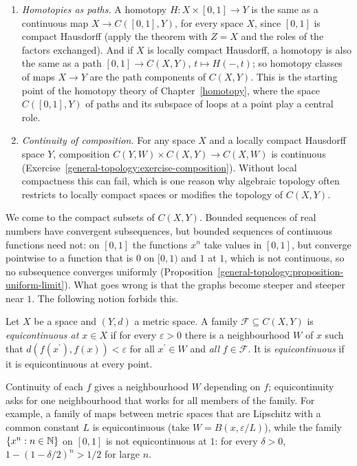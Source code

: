 \begin{example}\label{general-topology:example-exponential-law}
\begin{enumerate}
\item \emph{Homotopies as paths.} A homotopy $H \colon X \times [0, 1] \to Y$ is the same as a continuous map $X \to C([0, 1], Y)$, for every space $X$, since $[0, 1]$ is compact Hausdorff (apply
the theorem with $Z = X$ and the roles of the factors exchanged). And if $X$ is locally compact Hausdorff, a homotopy is also the same as a path $[0, 1] \to C(X, Y)$, $t \mapsto H(-, t)$; so
homotopy classes of maps $X \to Y$ are the path components of $C(X, Y)$. This is the starting point of the homotopy theory of Chapter~\ref{homotopy}, where the space $C([0, 1], Y)$ of paths and its
subspace of loops at a point play a central role.
\item \emph{Continuity of composition.} For any space $X$ and a locally compact Hausdorff space $Y$, composition $C(Y, W) \times C(X, Y) \to C(X, W)$ is continuous
(Exercise~\ref{general-topology:exercise-composition}). Without local compactness this can fail, which is one reason why algebraic topology often restricts to locally compact spaces or
modifies the topology of $C(X, Y)$.
\end{enumerate}
\end{example}

We come to the compact subsets of $C(X, Y)$. Bounded sequences of real numbers have convergent subsequences, but bounded sequences of continuous functions need not: on $[0, 1]$ the functions
$x^n$ take values in $[0, 1]$, but converge pointwise to a function that is $0$ on $[0, 1)$ and $1$ at $1$, which is not continuous, so no subsequence converges uniformly
(Proposition~\ref{general-topology:proposition-uniform-limit}). What goes wrong is that the graphs become steeper and steeper near $1$. The following notion forbids this.

\begin{definition}\label{general-topology:definition-equicontinuous}
Let $X$ be a space and $(Y, d)$ a metric space. A family $\mathcal{F} \subseteq C(X, Y)$ is \emph{equicontinuous at $x \in X$} if for every $\varepsilon > 0$ there is a neighbourhood $W$ of $x$
such that $d(f(x^{\prime}), f(x)) < \varepsilon$ for all $x^{\prime} \in W$ and \emph{all} $f \in \mathcal{F}$. It is \emph{equicontinuous} if it is equicontinuous at every point.
\end{definition}

Continuity of each $f$ gives a neighbourhood $W$ depending on $f$; equicontinuity asks for one neighbourhood that works for all members of the family. For example, a family of maps between metric
spaces that are Lipschitz with a common constant $L$ is equicontinuous (take $W = B(x, \varepsilon/L)$), while the family $\{x^n : n \in \mathbb{N}\}$ on $[0, 1]$ is not equicontinuous at $1$: for every
$\delta > 0$, $1 - (1 - \delta/2)^n > 1/2$ for large $n$.

